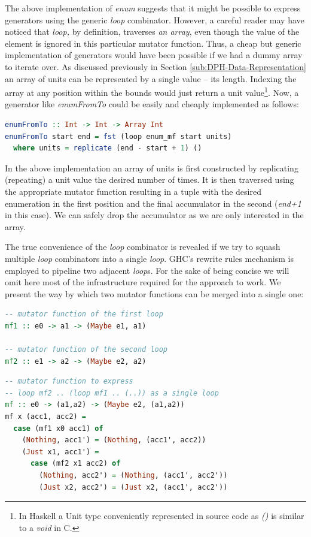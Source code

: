 \documentclass[preamble.tex]{subfiles}
\begin{document}
The above implementation of \emph{enum} suggests that it might be possible to express generators using the generic \emph{loop} combinator. However, a careful reader may have noticed that \emph{loop,} by definition, traverses \emph{an array}, even though the value of the element is ignored in this particular mutator function. Thus, a cheap but generic implementation of generators would have been possible if we had a dummy array to iterate over. As discussed previously in Section \ref{sub:DPH-Data-Representation} an array of units can be represented by a single value -- its length. Indexing the array at any position within the bounds would just return a unit value\footnote{In Haskell a Unit type conveniently represented in source code as \emph{()} is similar to a \emph{void} in C.}. Now, a generator like \emph{enumFromTo} could be easily and cheaply implemented as follows:

\begin{lstlisting}[basicstyle={\ttfamily},language=Haskell]
enumFromTo :: Int -> Int -> Array Int
enumFromTo start end = fst (loop enum_mf start units)
  where units = replicate (end - start + 1) ()
\end{lstlisting}


In the above implementation an array of units is first constructed by replicating (repeating) a unit value the desired number of times. It is then traversed using the appropriate mutator function resulting in a tuple with the desired enumeration in the first position and the final accumulator in the second (\emph{end+1} in this case). We can safely drop the accumulator as we are only interested in the array.

The true convenience of the \emph{loop} combinator is revealed if we try to squash multiple \emph{loop} combinators into a single \emph{loop}. GHC's rewrite rules mechanism is employed to pipeline two adjacent \emph{loop}s. For the sake of being concise we will omit here most of the infrastructure required for the approach to work. We present the way by which two mutator functions can be merged into a single one:

\begin{lstlisting}[basicstyle={\ttfamily},language=Haskell]
-- mutator function of the first loop
mf1 :: e0 -> a1 -> (Maybe e1, a1)

-- mutator function of the second loop
mf2 :: e1 -> a2 -> (Maybe e2, a2)
\end{lstlisting}


\begin{lstlisting}[basicstyle={\ttfamily},language=Haskell]
-- mutator function to express
-- loop mf2 .. (loop mf1 .. (..)) as a single loop
mf :: e0 -> (a1,a2) -> (Maybe e2, (a1,a2))
mf x (acc1, acc2) =
  case (mf1 x0 acc1) of
    (Nothing, acc1') = (Nothing, (acc1', acc2))
    (Just x1, acc1') =
      case (mf2 x1 acc2) of
        (Nothing, acc2') = (Nothing, (acc1', acc2'))
        (Just x2, acc2') = (Just x2, (acc1', acc2'))
\end{lstlisting}
\end{document}
